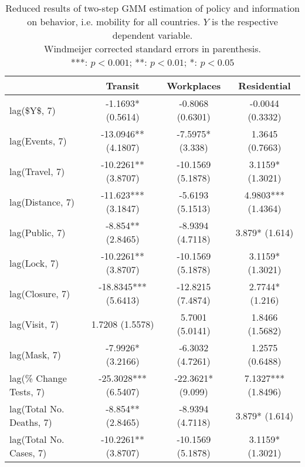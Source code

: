 \begin{table}[ht]
\centering
\begingroup\small
\begin{tabular}{lccc}
  \toprule
 & Transit & Workplaces & Residential \\ 
  \midrule
lag(\$Y\$, 7) & -1.1693* (0.5614) & -0.8068 (0.6301) & -0.0044 (0.3332) \\ 
  lag(Events, 7) & -13.0946** (4.1807) & -7.5975* (3.338) & 1.3645 (0.7663) \\ 
  lag(Travel, 7) & -10.2261** (3.8707) & -10.1569 (5.1878) & 3.1159* (1.3021) \\ 
  lag(Distance, 7) & -11.623*** (3.1847) & -5.6193 (5.1513) & 4.9803*** (1.4364) \\ 
  lag(Public, 7) & -8.854** (2.8465) & -8.9394 (4.7118) & 3.879* (1.614) \\ 
  lag(Lock, 7) & -10.2261** (3.8707) & -10.1569 (5.1878) & 3.1159* (1.3021) \\ 
  lag(Closure, 7) & -18.8345*** (5.6413) & -12.8215 (7.4874) & 2.7744* (1.216) \\ 
  lag(Visit, 7) & 1.7208 (1.5578) & 5.7001 (5.0141) & 1.8466 (1.5682) \\ 
  lag(Mask, 7) & -7.9926* (3.2166) & -6.3032 (4.7261) & 1.2575 (0.6488) \\ 
  lag(\% Change Tests, 7) & -25.3028*** (6.5407) & -22.3621* (9.099) & 7.1327*** (1.8496) \\ 
  lag(Total No. Deaths, 7) & -8.854** (2.8465) & -8.9394 (4.7118) & 3.879* (1.614) \\ 
  lag(Total No. Cases, 7) & -10.2261** (3.8707) & -10.1569 (5.1878) & 3.1159* (1.3021) \\ 
   \bottomrule
\end{tabular}
\endgroup
\caption{Reduced results of two-step GMM estimation of policy and information on behavior, i.e. mobility for all countries. $Y$ is the respective dependent variable.  \\ Windmeijer corrected standard errors in parenthesis. \\ ***: $p<0.001$; **: $p< 0.01$; *: $p< 0.05$} 
\label{tab_results:behavior_reduced_2}
\end{table}
